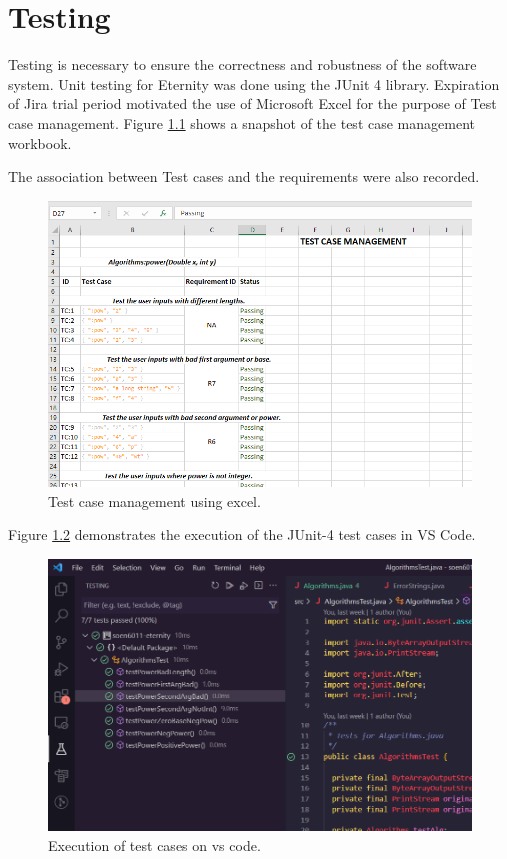 \documentclass[11pt,a4paper]{report}
\theoremstyle{definition}
\theoremstyle{remark}
\begin{document}
    \chapter {Testing}
    Testing is necessary to ensure the correctness and robustness of the software system. Unit testing for Eternity was done using the JUnit 4 library. Expiration of Jira trial period motivated the use of Microsoft Excel for the purpose of Test case management. Figure \ref{fig:test_case_management} shows a snapshot of the test case management workbook.
    
    The association between Test cases and the requirements were also recorded.
    
        \begin{figure}[htbp]
            \centering
            \includegraphics[width=\linewidth]{test_case_management.PNG}
            \caption{Test case management using excel.}
            \label{fig:test_case_management}
        \end{figure}
        
    Figure \ref{fig:passed_test_cases} demonstrates the execution of the JUnit-4 test cases in VS Code.
        
        \begin{figure}[htbp]
            \centering
            \includegraphics[width=\linewidth]{passed_test_cases.PNG}
            \caption{Execution of test cases on vs code.}
            \label{fig:passed_test_cases}
        \end{figure}
        
\end{document}
